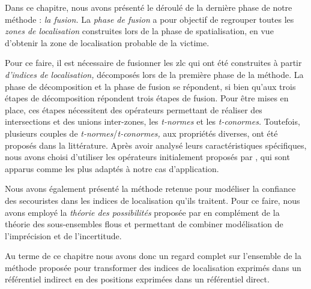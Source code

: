 Dans ce chapitre, nous avons présenté le déroulé de la dernière phase
de notre méthode : \emph{la fusion.} La \emph{phase de fusion} a pour
objectif de regrouper toutes les \emph{zones de localisation}
construites lors de la phase de spatialisation, en vue d'obtenir la
zone de localisation probable de la victime.

Pour ce faire, il est nécessaire de fusionner les \ac{zlc} qui ont été
construites à partir \emph{d'indices de localisation,} décomposés lors
de la première phase de la méthode. La phase de décomposition et la
phase de fusion se répondent, si bien qu'aux trois étapes de
décomposition répondent trois étapes de fusion. Pour être mises en
place, ces étapes nécessitent des opérateurs permettant de réaliser
des intersections et des unions inter-zones, les \emph{t-normes} et
les \emph{t-conormes.} Toutefois, plusieurs couples de
\emph{t-normes}/\emph{t-conormes,} aux propriétés diverses, ont été
proposés dans la littérature. Après avoir analysé leurs
caractéristiques spécifiques, nous avons choisi d'utiliser les
opérateurs initialement proposés par \textcite{Zadeh1965}, qui sont
apparus comme les plus adaptés à notre cas d’application.

Nous avons également présenté la méthode retenue pour modéliser la
confiance des secouristes dans les indices de localisation qu'ils
traitent. Pour ce faire, nous avons employé la \emph{théorie des
  possibilités} proposée par \textcite{Zadeh1978} en complément de la
théorie des sous-ensembles flous et permettant de combiner
modélisation de l’imprécision et de l'incertitude.

Au terme de ce chapitre nous avons donc un regard complet sur
l'ensemble de la méthode proposée pour transformer des indices de
localisation exprimés dans un référentiel indirect en des positions
exprimées dans un référentiel direct.


